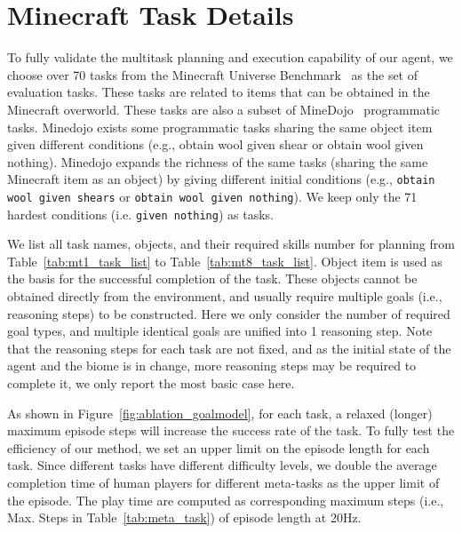 \documentclass{article}
\begin{document}


\section{Minecraft Task Details}\label{sec:task_details}

To fully validate the multitask planning and execution capability of our agent, we choose over 70 tasks from the Minecraft Universe Benchmark~\cite{mcu} as the set of evaluation tasks. These tasks are related to items that can be obtained in the Minecraft overworld. These tasks are also a subset of MineDojo~\cite{minedojo} programmatic tasks.
Minedojo exists some programmatic tasks sharing the same object item given different conditions (e.g., obtain wool given shear or obtain wool given nothing).
Minedojo expands the richness of the same tasks (sharing the same Minecraft item as an object) by giving different initial conditions (e.g., \texttt{obtain wool given shears} or \texttt{obtain wool given nothing}).
We keep only the 71 hardest conditions (i.e. \texttt{given nothing}) as tasks.

We list all task names, objects, and their required skills number for planning from Table~\ref{tab:mt1_task_list} to Table~\ref{tab:mt8_task_list}. 
Object item is used as the basis for the successful completion of the task. These objects cannot be obtained directly from the environment, and usually require multiple goals (i.e., reasoning steps) to be constructed. Here we only consider the number of required goal types, and multiple identical goals are unified into 1 reasoning step. 
Note that the reasoning steps for each task are not fixed, and as the initial state of the agent and the biome is in change, more reasoning steps may be required to complete it, we only report the most basic case here.


As shown in Figure~\ref{fig:ablation_goalmodel}, for each task, a relaxed (longer) maximum episode steps will increase the success rate of the task. To fully test the efficiency of our method, we set an upper limit on the episode length for each task. Since different tasks have different difficulty levels, we double the average completion time of human players for different meta-tasks as the upper limit of the episode. The play time are computed as corresponding maximum steps (i.e., Max. Steps in Table~\ref{tab:meta_task}) of episode length at 20Hz.



\end{document}
